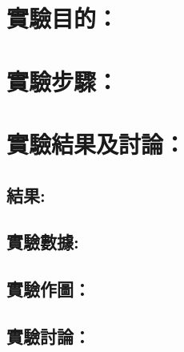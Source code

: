 \setlength{\parindent}{2em} %

\section*{實驗目的：}


\section*{實驗步驟：}


\section*{實驗結果及討論：}
\subsection*{結果:}


\subsection*{實驗數據:}


\subsection*{實驗作圖：}
  
\subsection*{實驗討論：}


 

